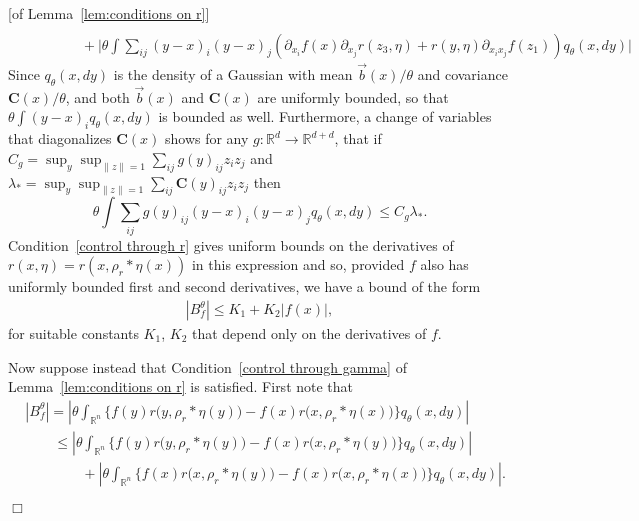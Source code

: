 \documentclass[12pt]{article}
\newenvironment {proof}{{\noindent\bf Proof }}{\hfill $\Box$ \medskip}
\newcommand{\IR}{\mathbb R}
\newcommand{\meanq}{\vec b}    %
\newcommand{\covq}{\mathbf{C}}     %
\newcommand{\kernel}{\rho}  %
\newcommand{\smooth}[1]{\kernel_{#1} \! * \!}  %
\numberwithin{equation}{section}
\begin{document}
\begin{proof}[of Lemma~\ref{lem:conditions on r}]
\begin{align*}
\\ &\qquad \qquad {} +
    \bigg| \theta \int \sum_{ij} (y-x)_i (y-x)_j 
        \left(
            \partial_{x_i} f(x) \partial_{x_j} r(z_3,\eta)
            + r(y,\eta) \partial_{x_ix_j} f(z_1)
        \right) q_\theta(x, dy) \bigg|
\end{align*}
Since $q_\theta(x,dy)$ is the density of a Gaussian with mean $\meanq(x)/\theta$
and covariance $\covq(x)/\theta$, and both $\meanq(x)$ and $\covq(x)$ are uniformly bounded,
so that $\theta \int (y-x)_i q_\theta(x,dy)$ is bounded as well.
Furthermore, a change of variables that diagonalizes $\covq(x)$
shows for any $g : \IR^d \to \IR^{d + d}$,
that if $C_g = \sup_y \sup_{\|z\| = 1} \sum_{ij} g(y)_{ij} z_i z_j$
and $\lambda_* = \sup_y \sup_{\|z\|=1} \sum_{ij} \covq(y)_{ij} z_i z_j$
then
$$ \theta \int \sum_{ij} g(y)_{ij} (y-x)_i (y-x)_j q_\theta(x, dy) \le C_g \lambda_* .  $$
Condition~\ref{control through r} 
gives uniform bounds on the derivatives of $r(x,\eta) = r(x,\rho_r*\eta(x))$
in this expression and so, provided $f$ also has uniformly bounded first and second derivatives,
we have a bound of the form
\begin{align*}
    |B^\theta_f| \leq K_1 + K_2 |f(x)| ,
\end{align*}
for suitable constants $K_1$, $K_2$ that depend only on the derivatives of $f$.

Now suppose instead that
Condition~\ref{control through gamma} of Lemma~\ref{lem:conditions on r} is satisfied.
First note that
    \begin{align}
	    \nonumber
    & |B_f^\theta| =
        \left| \theta 
            \int_{\IR^n} 
                \big\{
                    f(y) r\big(y,\smooth{r}\eta(y)\big)
                    -
                    f(x) r\big(x, \smooth{r}\eta(x)\big)
                \big\}
            q_{\theta}(x,dy)
        \right|
    \\ 
 \label{eqn:q_bound_split}
	    &\qquad {} \leq
        \left| \theta 
            \int_{\IR^n} 
                \big\{
                    f(y) r\big(y, \smooth{r}\eta(y)\big)
                    -
                    f(x) r\big(x,\smooth{r}\eta(y)\big)
                \big\}
            q_{\theta}(x,dy)
        \right|
    \\ 
\nonumber
	    &\qquad \qquad {}  +
        \left| \theta 
            \int_{\IR^n} 
                \big\{
                    f(x) r\big(x,\smooth{r}\eta(y)\big)
                    -
                    f(x) r\big(x,\smooth{r}\eta(x)\big)
                \big\}
            q_{\theta}(x,dy) 
        \right| .
    \end{align}


\end{proof}
\end{document}
